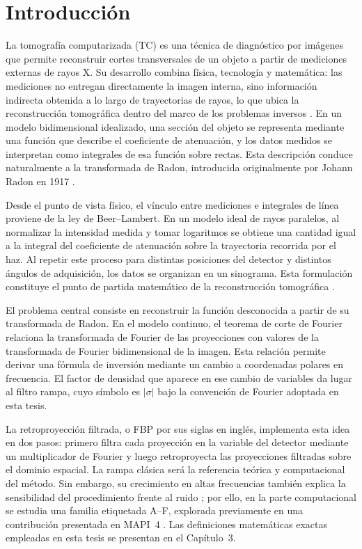 \chapter*{Introducción}

La tomografía computarizada (TC) es una técnica de diagnóstico por imágenes que permite reconstruir cortes transversales de un objeto a partir de mediciones externas de rayos X. Su desarrollo combina física, tecnología y matemática: las mediciones no entregan directamente la imagen interna, sino información indirecta obtenida a lo largo de trayectorias de rayos, lo que ubica la reconstrucción tomográfica dentro del marco de los problemas inversos \cite{kirsch2011}. En un modelo bidimensional idealizado, una sección del objeto se representa mediante una función que describe el coeficiente de atenuación, y los datos medidos se interpretan como integrales de esa función sobre rectas. Esta descripción conduce naturalmente a la transformada de Radon, introducida originalmente por Johann Radon en 1917 \cite{radon1917}.

Desde el punto de vista físico, el vínculo entre mediciones e integrales de línea proviene de la ley de Beer--Lambert. En un modelo ideal de rayos paralelos, al normalizar la intensidad medida y tomar logaritmos se obtiene una cantidad igual a la integral del coeficiente de atenuación sobre la trayectoria recorrida por el haz. Al repetir este proceso para distintas posiciones del detector y distintos ángulos de adquisición, los datos se organizan en un sinograma. Esta formulación constituye el punto de partida matemático de la reconstrucción tomográfica \cite{barrett_swindell1996,kuchment2014}.

El problema central consiste en reconstruir la función desconocida a partir de su transformada de Radon. En el modelo continuo, el teorema de corte de Fourier relaciona la transformada de Fourier de las proyecciones con valores de la transformada de Fourier bidimensional de la imagen. Esta relación permite derivar una fórmula de inversión mediante un cambio a coordenadas polares en frecuencia. El factor de densidad que aparece en ese cambio de variables da lugar al filtro rampa, cuyo símbolo es $|\sigma|$ bajo la convención de Fourier adoptada en esta tesis.

La retroproyección filtrada, o FBP por sus siglas en inglés, implementa esta idea en dos pasos: primero filtra cada proyección en la variable del detector mediante un multiplicador de Fourier y luego retroproyecta las proyecciones filtradas sobre el dominio espacial. La rampa clásica será la referencia teórica y computacional del método. Sin embargo, su crecimiento en altas frecuencias también explica la sensibilidad del procedimiento frente al ruido \cite[Cap.~3]{kak_slaney1988}\cite[Sec.~V.1]{natterer2001}; por ello, en la parte computacional se estudia una familia etiquetada A--F, explorada previamente en una contribución presentada en MAPI~4 \cite{velez_lopez2026mapi4}. Las definiciones matemáticas exactas empleadas en esta tesis se presentan en el Capítulo~3.\\

